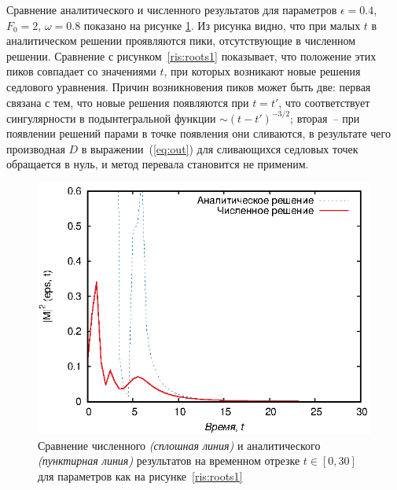 \documentclass[14pt, a4paper]{article}
\numberwithin{figure}{section}
\numberwithin{equation}{section}
\begin{document}
Сравнение аналитического и численного результатов для параметров $\epsilon = 0.4$, $F_0 = 2$, $\omega = 0.8$ показано на рисунке \ref{ris:full1}. 
Из рисунка видно, что при малых $t$ в аналитическом решении проявляются пики, отсутствующие в численном решении. Сравнение с рисунком~\ref{ris:roots1} показывает, что положение этих пиков совпадает со значениями $t$, при которых возникают новые решения седлового уравнения. Причин возникновения пиков может быть две: первая связана с тем, что новые решения появляются при $t=t'$, что соответствует сингулярности в подынтегральной функции $\sim(t-t')^{-3/2}$; вторая~-- при появлении решений парами в точке появления они сливаются, в результате чего производная $D$ в выражении~(\ref{eq:out}) для сливающихся седловых точек обращается в нуль, и метод перевала становится не применим. 

\begin{figure}[h]
	\begin{center}
			\includegraphics[width=1\linewidth]{full1}
			\caption{Сравнение численного \textit{(сплошная линия)} и аналитического \textit{(пунктирная линия)} результатов на временном отрезке $t\in[0, 30]$ для параметров как на рисунке~\ref{ris:roots1}} %
			\label{ris:full1} %
	\end{center}
\end{figure}
\end{document}
